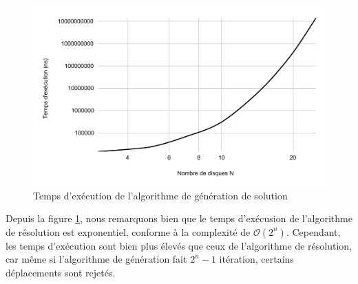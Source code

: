 \begin{figure}[H]
    \centering
        \includegraphics[scale=0.6]{./ressources/temps_execution_algo_generation.pdf}
        \caption{Temps d'exécution de l'algorithme de génération de solution}
    \label{fig:temps_exec_algo_generation}
\end{figure}
\par
Depuis la figure \ref{fig:temps_exec_algo_generation}, nous remarquons bien que le temps d'exécusion de l'algorithme de résolution est exponentiel, conforme à la complexité de $\mathcal{O}(2^{n})$. Cependant, les temps d'exécution sont bien plus élevés que ceux de l'algorithme de résolution, car même si l'algorithme de génération fait $2^{n} - 1$ itération, certains déplacements sont rejetés.

